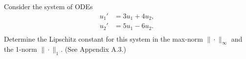 

Consider the system of ODEs
\begin{equation*}
\begin{split}
u_1' &= 3u_1 + 4u_2,\\
u_2' &= 5u_1 - 6u_2.\\
\end{split}
\end{equation*}
Determine the Lipschitz constant for this system in the max-norm
$\|\cdot\|_\infty$ and the 1-norm $\|\cdot\|_1$. (See Appendix A.3.)


